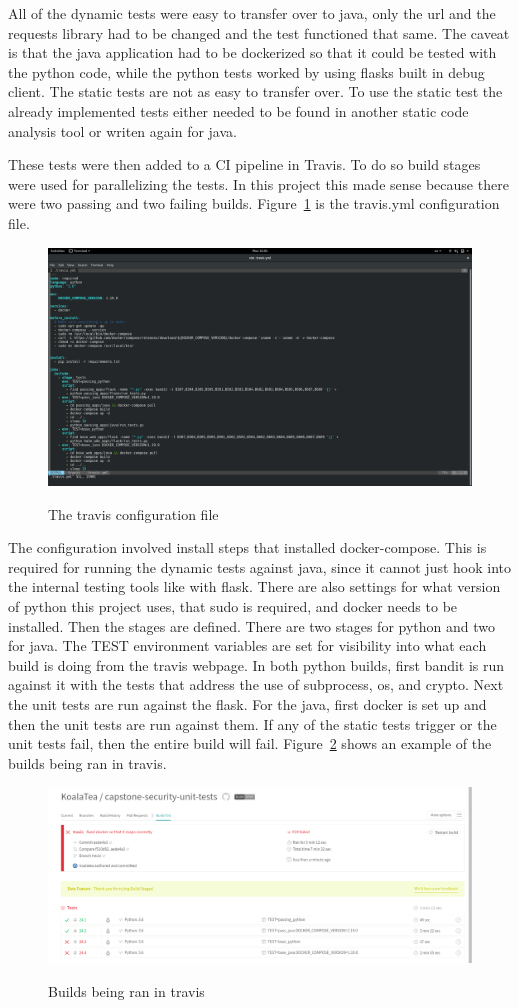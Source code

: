 All of the dynamic tests were easy to transfer over to java, only the url and the requests library had to be changed and the test functioned that same. The caveat is that the java application had to
be dockerized so that it could be tested with the python code, while the python tests worked by using flasks built in debug client. The static tests are not as easy to transfer over. To use the
static test the already implemented tests either needed to be found in another static code analysis tool or writen again for java.

These tests were then added to a CI pipeline in Travis. To do so build stages were used for parallelizing the tests. In this project this made sense because there were two passing and two failing
builds. Figure~\ref{fig:fig4} is the travis.yml configuration file.
\begin{figure}[!ht]
  \centering
\includegraphics[width=6in]{travis}
\caption{\label{fig:fig4}}The travis configuration file
\end{figure}
The configuration involved install steps that installed docker-compose. This is required for running the dynamic tests against java, since it cannot just hook into the internal testing tools like
with flask. There are also settings for what version of python this project uses, that sudo is required, and docker needs to be installed. Then the stages are defined. There are two stages for python
and two for java. The TEST environment variables are set for visibility into what each build is doing from the travis webpage. In both python builds, first bandit is run against it with the tests
that address the use of subprocess, os, and crypto. Next the unit tests are run against the flask. For the java, first docker is set up and then the unit tests are run against them. If any of the
static tests trigger or the unit tests fail, then the entire build will fail. Figure~\ref{fig:fig5} shows an example of the builds being ran in travis.
\begin{figure}[!ht]
  \centering
\includegraphics[width=6in]{travisbuilds}
\caption{\label{fig:fig5}}Builds being ran in travis
\end{figure}

